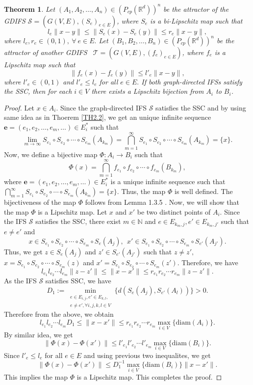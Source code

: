 \documentclass[a4paper,12pt,reqno]{amsart}
\numberwithin{equation}{section}
\newtheorem{theorem}{Theorem}[section]
\theoremstyle{definition}
\theoremstyle{remark}
\numberwithin{equation}{section}
\begin{document}
\begin{theorem} \label{THML}Let $(A_1,A_2,\dots,A_n)\in (P_{cp}(\mathbb{R}^d))^n$ be the attractor of the GDIFS
$\mathcal S=(G(V,E),(S_e)_{e\in E})$, where $S_e$ is a bi-Lipschitz map such that
$$l_{e}\|x-y\|\leq \|S_e(x)-S_{e}(y)\|\leq r_{e}\|x-y\|,$$ where $l_e,r_e\in (0,1),~ \forall~e\in E.$ 
Let $(B_1,B_2,\dots,B_n)\in (P_{cp}(\mathbb{R}^d))^n$ be the attractor of another GDIFS~ $\mathcal T=(G(V,E),(f_e)_{e\in E})$, where $f_e$ is a Lipschitz map such that 
$$\|f_e(x)-f_{e}(y)\|\leq l'_{e}\|x-y\|,$$ where $l'_{e}\in (0,1)$ and $l'_{e}\leq l_{e}$ for all $e\in E.$
If both graph-directed IFSs satisfy the SSC, then for each $i\in V$ there exists a Lipschitz bijection from $A_i$ to $B_i$.
\end{theorem}
\begin{proof} Let $x\in A_i$. Since the graph-directed IFS  $\mathcal S$ satisfies the SSC and by using same idea as in Thoerem \ref{TH2.2}, we get an unique infinite sequence $\mathbf{e}=(e_1,e_2,\dots,e_m,\dots)\in E_{i}^*$ such that $$ \lim_{ m \to \infty} S_{e_1} \circ S_{e_2}\circ \cdots  \circ S_{e_m}(A_{k_m})=\bigcap_{m=1}^{\infty} S_{e_1} \circ S_{e_2}\circ \cdots  \circ S_{e_m}(A_{k_m})= \{x\}.$$ 
Now, we define a bijective map $\Phi: A_i\to B_i $ such that $$\Phi(x)=\bigcap_{m=1}^{\infty} f_{e_1} \circ f_{e_2}\circ \cdots  \circ f_{e_m}(B_{k_m}),$$
where $\mathbf{e}=(e_1,e_2,\dots,e_m,\dots)\in E_{i}^*$ is a unique\cite{GC} infinite sequence such that  $\bigcap_{m=1}^{\infty} S_{e_1} \circ S_{e_2}\circ \cdots  \circ S_{e_m}(A_{k_m})= \{x\}$. Thus, the map $\Phi$ is well defined. The bijectiveness of the map $\Phi$ follows from Lemma 1.3.5 \cite{GC}. Now, we will show that the map $\Phi$ is a Lipschitz map. Let $x$ and $x'$ be two distinct points of $A_i$. Since the IFS $\mathcal S$ satisfies the SSC, there exist $m\in \mathbb{N}$ and $e\in E_{k_m,j}, e'\in E_{k_m,j'}$ such that $e\ne e'$ and $$x\in S_{e_1} \circ S_{e_2}\circ \cdots  \circ S_{e_m}\circ S_{e}(A_{j}),~~x'\in S_{e_1} \circ S_{e_2}\circ \cdots  \circ S_{e_m}\circ S_{e'}(A_{j'}).$$ 
Thus, we get $z\in S_{e}(A_{j})$ and $z'\in S_{e'}(A_{j'})$ such that $z\ne z',$ $x=S_{e_1} \circ S_{e_2}\circ \cdots  \circ S_{e_m}(z)$ and $ x'=S_{e_1} \circ S_{e_2}\circ \cdots  \circ S_{e_m}(z').$ Therefore, we have 
$$l_{e_1}l_{e_2}\cdots l_{e_m}\|z-z'\|\leq \|x-x'\|\leq r_{e_1}r_{e_2}\cdots r_{e_m}\|z-z'\|.$$ As  the IFS $\mathcal S$ satisfies SSC, we have $$D_1:=\min\limits_{\substack{e\in E_{i,j},e'\in E_{k,l},\\ e\ne e', \forall i,j,k,l\in V}}\{ d(S_{e}(A_j), S_{e'}(A_l))\}>0.$$ Therefore from the above, we obtain
$$l_{e_1}l_{e_2}\cdots l_{e_m} D_1\leq \|x-x'\|\leq r_{e_1}r_{e_2}\cdots r_{e_m} \max_{i\in V}\{\text{diam}(A_i)\}.$$
By similar idea, we get
$$\|\Phi(x)-\Phi(x')\|\leq l'_{e_1}l'_{e_2}\cdots l'_{e_m} \max_{i\in V}\{\text{diam}(B_i)\}.$$ Since $l'_{e}\leq l_{e}$ for all $e\in E$ and using previous two inequalites, we get
$$ \|\Phi(x)-\Phi(x')\|\leq D_{1}^{-1} \max_{i\in V}\{\text{diam}(B_i)\}\|x-x'\|.$$
This implies the map $\Phi$ is a Lipschitz map.
This completes the proof.
\end{proof}
\end{document}
